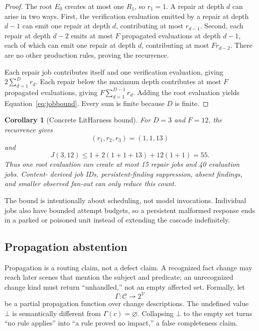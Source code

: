 \documentclass[11pt]{article}
\newtheorem{corollary}[definition]{Corollary}
\begin{document}
\begin{proof}
The root $E_0$ creates at most one $R_1$, so $r_1=1$. A repair at depth $d$ can arise in two
ways. First, the verification evaluation emitted by a repair at depth $d-1$ can emit one
repair at depth $d$, contributing at most $r_{d-1}$. Second, each repair at depth $d-2$
emits at most $F$ propagated evaluations at depth $d-1$, each of which can emit one repair at
depth $d$, contributing at most $F r_{d-2}$. There are no other production rules, proving
the recurrence.

Each repair job contributes itself and one verification evaluation, giving
$2\sum_{d=1}^D r_d$. Each repair below the maximum depth contributes at most $F$ propagated
evaluations, giving $F\sum_{d=1}^{D-1}r_d$. Adding the root evaluation yields
Equation~\eqref{eq:jobbound}. Every sum is finite because $D$ is finite.
\end{proof}

\begin{corollary}[Concrete LitHarness bound]
For $D=3$ and $F=12$, the recurrence gives
\[
 (r_1,r_2,r_3)=(1,1,13)
\]
and
\[
 J(3,12)\le 1+2(1+1+13)+12(1+1)=55.
\]
Thus one root evaluation can create at most 15 repair jobs and 40 evaluation jobs. Content-
derived job IDs, persistent-finding suppression, absent findings, and smaller observed
fan-out can only reduce this count.
\end{corollary}

The bound is intentionally about scheduling, not model invocations. Individual jobs also
have bounded attempt budgets, so a persistent malformed response ends in a parked or poisoned
unit instead of extending the cascade indefinitely.

\subsection{Propagation abstention}

Propagation is a routing claim, not a defect claim. A recognized fact change may reach later
scenes that mention the subject and predicate; an unrecognized change kind must return
``unhandled,'' not an empty affected set. Formally, let
\[
 \Gamma:\mathcal{C}\rightharpoonup 2^{\mathcal{V}}
\]
be a partial propagation function over change descriptions. The undefined value $\bot$ is
semantically different from $\Gamma(c)=\varnothing$. Collapsing $\bot$ to the empty set turns
``no rule applies'' into ``a rule proved no impact,'' a false completeness claim.
\end{document}
